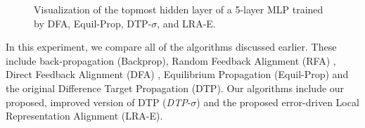 \documentclass[letterpaper]{article} %
\begin{document}
\begin{figure}[!t]
\centering     %
{}
\caption{Visualization of the topmost hidden layer of a 5-layer MLP trained by DFA, Equil-Prop, DTP-$\sigma$, and LRA-E.}
\label{fig:tsne_plots}
\end{figure}

In this experiment, we compare all of the algorithms discussed earlier. These include back-propagation (Backprop), Random Feedback Alignment (RFA) \cite{lillicrap2014random}, Direct Feedback Alignment (DFA) \cite{nokland2016direct}, Equilibrium Propagation \cite{scellier2017equilibrium} (Equil-Prop)
and the original Difference Target Propagation \cite{lee2015difference} (DTP). Our algorithms include our proposed, improved version of DTP (\textit{DTP}-$\sigma$) and the proposed error-driven Local Representation Alignment (LRA-E). %
\end{document}
